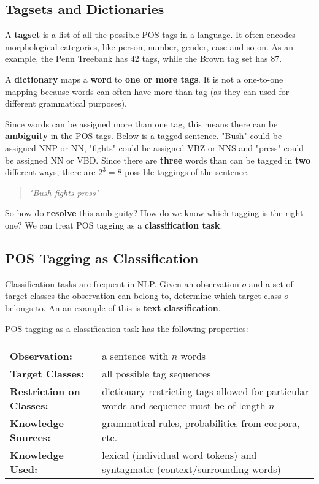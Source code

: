 \documentclass{article}
\begin{document}
\subsection{Tagsets and Dictionaries}

A \textbf{tagset} is a list of all the possible POS tags in a language. It often encodes morphological categories, like person, number, gender,  case and so on. As an example, the Penn Treebank has 42 tags, while the Brown tag set has 87.

A \textbf{dictionary} maps a \textbf{word} to \textbf{one or more tags}. It is not a one-to-one mapping because words can often have more than tag (as they can used for different grammatical purposes).

Since words can be assigned more than one tag, this means there can be \textbf{ambiguity} in the POS tags. Below is a tagged sentence. "Bush" could be assigned NNP or NN, "fights" could be assigned VBZ or NNS and "press" could be assigned NN or VBD. Since there are \textbf{three} words than can be tagged in \textbf{two} different ways, there are $2^3 = 8$ possible taggings of the sentence.
\begin{quote}
\textit{"Bush fights press"}
\end{quote}
So how do \textbf{resolve} this ambiguity? How do we know which tagging is the right one? We can treat POS tagging as a \textbf{classification task}.

\subsection{POS Tagging as Classification}

Classification tasks are frequent in NLP. Given an observation $o$ and a set of target classes the observation can belong to, determine which target class $o$ belongs to. An an example of this is \textbf{text classification}.

POS tagging as a classification task has the following properties:
\paragraph{}
\begin{tabular}{ll}
	\textbf{Observation:} & a sentence with $n$ words \\
	\textbf{Target Classes:} & all possible tag sequences \\
	\textbf{Restriction on Classes:} & dictionary restricting tags allowed for particular words and sequence must be of length $n$ \\
	\textbf{Knowledge Sources:} & grammatical rules, probabilities from corpora, etc. \\
	\textbf{Knowledge Used:} & lexical (individual word tokens) and syntagmatic (context/surrounding words) \\			
\end{tabular}
\end{document}
